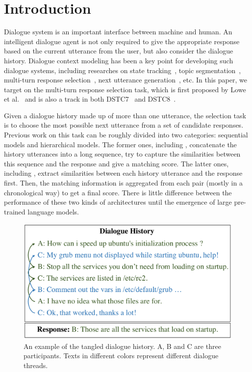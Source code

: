 \section{Introduction}

Dialogue system is an important interface between machine and human.  An intelligent dialogue agent is not only required to give the appropriate response based on the current utterance from the user, but also consider the dialogue history. Dialogue context modeling has been a key point for developing such dialogue systems, including researches on state tracking~\cite{abs-1907-01669,RenNM19}, topic segmentation~\cite{NanDNX19,kim2019dynamic}, multi-turn response selection~\cite{TaoWXHZY19,GuLL19}, next utterance generation~\cite{abs-1911-00536,ChenCQYW19}, etc. In this paper, we target on the multi-turn response selection task, which is first proposed by Lowe et al.~ and is also a track in both DSTC7~\cite{gunasekara2019dstc7} and DSTC8~\cite{dstc8}.


Given a dialogue history made up of more than one utterance, the selection task is to choose the most possible next utterance from a set of candidate responses.  Previous work on this task can be roughly divided into two categories: sequential models and hierarchical models. The former ones, including \cite{LowePSP15,YanSW16,abs-1901-02609}, concatenate the history utterances into a long sequence, try to capture the similarities between this sequence and the response and give a matching score. The latter ones, including \cite{TaoWXHZY19,WangWC19,GuLL19}, extract similarities between each history utterance and the response first. Then, the matching information is aggregated from each pair 
(mostly in a chronological way) to get a final score. 
There is little difference between the performance of these two kinds of 
architectures until the emergence of large pre-trained language models.
 
 \begin{figure}
 	\centering
 	\includegraphics[scale=0.39]{pic/example.pdf}
 	\caption{An example of the tangled dialogue history. A, B and C are three participants. Texts in different colors represent different dialogue threads.}
 	\label{fig:example}
 \end{figure}
 
